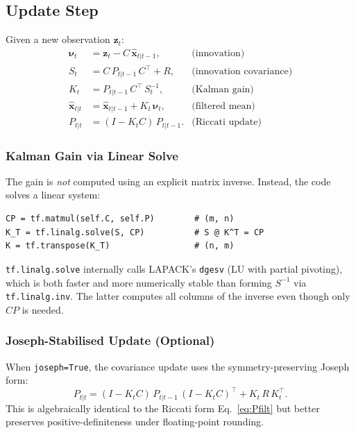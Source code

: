 \documentclass[11pt,a4paper]{article}
\newcommand{\py}[1]{\lstinline[style=py]{#1}}
\begin{document}
\subsection{Update Step}
\label{sec:update}

Given a new observation $\bm{z}_t$:
\begin{align}
  \bm{\nu}_t &= \bm{z}_t - C\,\hat{\bm{x}}_{t|t-1},
    &\text{(innovation)} \label{eq:innov}\\
  S_t &= C\,P_{t|t-1}\,C^\top + R,
    &\text{(innovation covariance)} \label{eq:S}\\
  K_t &= P_{t|t-1}\,C^\top\,S_t^{-1},
    &\text{(Kalman gain)} \label{eq:gain}\\
  \hat{\bm{x}}_{t|t} &= \hat{\bm{x}}_{t|t-1} + K_t\,\bm{\nu}_t,
    &\text{(filtered mean)} \label{eq:xfilt}\\
  P_{t|t} &= (I - K_t C)\,P_{t|t-1}.
    &\text{(Riccati update)} \label{eq:Pfilt}
\end{align}

\subsubsection{Kalman Gain via Linear Solve}

The gain is \emph{not} computed using an explicit matrix inverse.
Instead, the code solves a linear system:

\begin{lstlisting}[caption={Gain computation via \py{tf.linalg.solve}.}]
CP = tf.matmul(self.C, self.P)        # (m, n)
K_T = tf.linalg.solve(S, CP)          # S @ K^T = CP
K = tf.transpose(K_T)                 # (n, m)
\end{lstlisting}

\py{tf.linalg.solve} internally calls LAPACK's \texttt{dgesv}
(LU with partial pivoting), which is both faster and more numerically
stable than forming $S^{-1}$ via \py{tf.linalg.inv}.  The latter
computes all columns of the inverse even though only $CP$ is needed.

\subsubsection{Joseph-Stabilised Update (Optional)}

When \py{joseph=True}, the covariance update uses the
symmetry-preserving Joseph form:
\begin{equation}
  P_{t|t} = (I - K_tC)\,P_{t|t-1}\,(I - K_tC)^\top
           + K_t\,R\,K_t^\top.
  \label{eq:joseph}
\end{equation}
This is algebraically identical to the Riccati form
Eq.~\eqref{eq:Pfilt} but better preserves positive-definiteness
under floating-point rounding.
\end{document}
